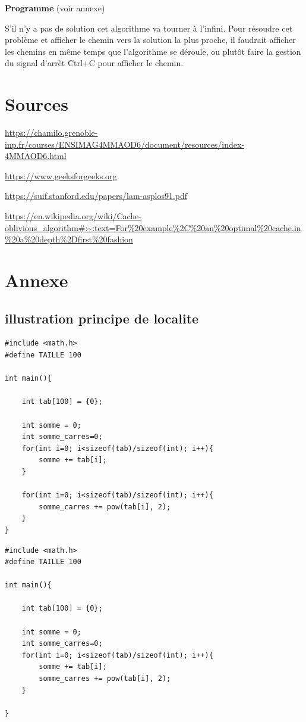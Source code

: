 \documentclass[a4paper]{article}
\begin{document}
\textbf{Programme} (voir annexe)

S'il n'y a pas de solution cet algorithme va tourner à l'infini. Pour résoudre cet problème et afficher le chemin vers la solution la plus proche, il faudrait afficher les chemins en même temps que l'algorithme se déroule, ou plutôt faire la gestion du signal d'arrêt Ctrl+C pour afficher le chemin.



\section{Sources}
\label{sec:org87cee36}

\url{https://chamilo.grenoble-inp.fr/courses/ENSIMAG4MMAOD6/document/resources/index-4MMAOD6.html}


\url{https://www.geeksforgeeks.org}


\url{https://suif.stanford.edu/papers/lam-asplos91.pdf}


\url{https://en.wikipedia.org/wiki/Cache-oblivious\_algorithm\#:\~:text=For\%20example\%2C\%20an\%20optimal\%20cache,in\%20a\%20depth\%2Dfirst\%20fashion}



\clearpage


\section{Annexe}
\label{sec:org70f29f8}


\subsection{illustration principe de localite}
\label{sec:orgcf25544}

\begin{verbatim}
#include <math.h>
#define TAILLE 100

int main(){

    int tab[100] = {0};

    int somme = 0;
    int somme_carres=0;
    for(int i=0; i<sizeof(tab)/sizeof(int); i++){
        somme += tab[i];
    }

    for(int i=0; i<sizeof(tab)/sizeof(int); i++){
        somme_carres += pow(tab[i], 2);
    }
}
\end{verbatim}

\begin{verbatim}
#include <math.h>
#define TAILLE 100

int main(){

    int tab[100] = {0};

    int somme = 0;
    int somme_carres=0;
    for(int i=0; i<sizeof(tab)/sizeof(int); i++){
        somme += tab[i];
        somme_carres += pow(tab[i], 2);
    }

}

\end{verbatim}
\end{document}
